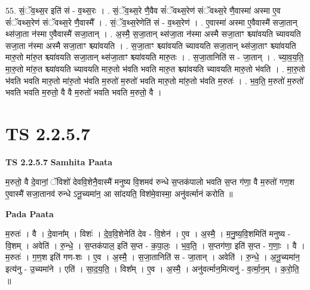 \documentclass[17pt]{extarticle}
\begin{document}
55. सं॒ॅव॒थ्स॒र इति॑ सं - व॒थ्स॒रः । . सं॒ॅव॒थ्स॒रे णै॒वैव सं॑ॅवथ्स॒रेण॑ संॅवथ्स॒रे णै॒वास्मा॑ अस्मा ए॒व सं॑ॅवथ्स॒रेण॑ संॅवथ्स॒रे णै॒वास्मै᳚ । . सं॒ॅव॒थ्स॒रेणेति॑ सं - व॒थ्स॒रेण॑ । . ए॒वास्मा॑ अस्मा ए॒वैवास्मै॑ सजा॒तान् थ्स॑जा॒ता न॑स्मा ए॒वैवास्मै॑ सजा॒तान् । . अ॒स्मै॒ स॒जा॒तान् थ्स॑जा॒ता न॑स्मा अस्मै सजा॒ताꣳ श्च्या॑वयति च्यावयति सजा॒ता न॑स्मा अस्मै सजा॒ताꣳ
श्च्या॑वयति । . स॒जा॒ताꣳ श्च्या॑वयति च्यावयति सजा॒तान् थ्स॑जा॒ताꣳ श्च्या॑वयति मारु॒तो मा॑रु॒त श्च्या॑वयति सजा॒तान् थ्स॑जा॒ताꣳ श्च्या॑वयति मारु॒तः । . स॒जा॒तानिति॑ स - जा॒तान् । . च्या॒व॒य॒ति॒ मा॒रु॒तो मा॑रु॒त श्च्या॑वयति च्यावयति मारु॒तो भ॑वति भवति मारु॒त श्च्या॑वयति च्यावयति मारु॒तो भ॑वति । . मा॒रु॒तो भ॑वति भवति मारु॒तो मा॑रु॒तो भ॑वति म॒रुतो॑ म॒रुतो॑ भवति मारु॒तो मा॑रु॒तो भ॑वति म॒रुतः॑ । . भ॒व॒ति॒ म॒रुतो॑ म॒रुतो॑ भवति भवति म॒रुतो॒ वै वै म॒रुतो॑ भवति भवति म॒रुतो॒ वै । \newline
\pagebreak
{}
\section*{ TS 2.2.5.7 }

\textbf{TS 2.2.5.7 } \newline
\textbf{Samhita Paata} \newline

म॒रुतो॒ वै दे॒वानां॒ ॅविशो॑ देववि॒शेनै॒वास्मै॑ मनुष्य वि॒शमव॑ रुन्धे स॒प्तक॑पालो भवति स॒प्त ग॑णा॒ वै म॒रुतो॑ गण॒श ए॒वास्मै॑ सजा॒तानव॑ रुन्धे ऽनू॒च्यमा॑न॒ आ सा॑दयति॒ विश॑मे॒वास्मा॒ अनु॑वर्त्मानं करोति ॥ \newline

\textbf{Pada Paata} \newline

म॒रुतः॑ । वै । दे॒वाना᳚म् । विशः॑ । दे॒व॒वि॒शेनेति॑ देव - वि॒शेन॑ । ए॒व । अ॒स्मै॒ । म॒नु॒ष्य॒वि॒शमिति॑ मनुष्य - वि॒शम् । अवेति॑ । रु॒न्धे॒ । स॒प्तक॑पाल॒ इति॑ स॒प्त - क॒पा॒लः॒ । भ॒व॒ति॒ । स॒प्तग॑णा॒ इति॑ स॒प्त - ग॒णाः॒ । वै । म॒रुतः॑ । ग॒ण॒श इति॑ गण-शः । ए॒व । अ॒स्मै॒ । स॒जा॒तानिति॑ स - जा॒तान् । अवेति॑ । रु॒न्धे॒ । अ॒नू॒च्यमा॑न॒ इत्य॑नु - उ॒च्यमा॑ने । एति॑ । सा॒द॒य॒ति॒ । विश᳚म् । ए॒व । अ॒स्मै॒ । अनु॑वर्त्मान॒मित्यनु॑ - व॒र्त्मा॒न॒म् । क॒रो॒ति॒ ॥  \newline
\end{document}
